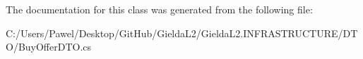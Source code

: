 The documentation for this class was generated from the following file\+:\begin{DoxyCompactItemize}
\item 
C\+:/\+Users/\+Pawel/\+Desktop/\+Git\+Hub/\+Gielda\+L2/\+Gielda\+L2.\+I\+N\+F\+R\+A\+S\+T\+R\+U\+C\+T\+U\+R\+E/\+D\+T\+O/Buy\+Offer\+D\+T\+O.\+cs\end{DoxyCompactItemize}
